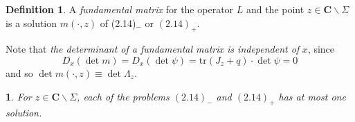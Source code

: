 \documentclass{surv-l}
\theoremstyle{plain}
\newtheorem{prop}[theorem]{\sc{Proposition}}
\theoremstyle{definition}
\newtheorem*{defi}{\sc Definition}
\numberwithin{equation}{chapter}
\begin{document}
\begin{defi}
A \emph{fundamental matrix} for the operator $L$ and the point $ z\in \mathbf{C}\backslash \Sigma$ is a solution $m(\cdot,z)$ of (2.14)$_{-}$ or $(2.14)_{+}$.

Note that \emph{the determinant of a fundamental matrix is independent of} $x$, since
\begin{equation*}
D_{x}(\det m)=D_{x}(\det\psi)= \mathrm{tr} (J_{z}+q)\cdot \det\psi=0
\end{equation*}
    and so $\det m(\cdot, z)\equiv\det\Lambda_{z}$.
\end{defi}
\setcounter{theorem}{14}
\begin{prop}\label{prop2.15}
For $z\in \mathbf{C}\backslash \Sigma$,  each of the problems $(2.14)_{-}$ and $(2.14)_{+}$
has at most one solution.
\end{prop}
\end{document}

